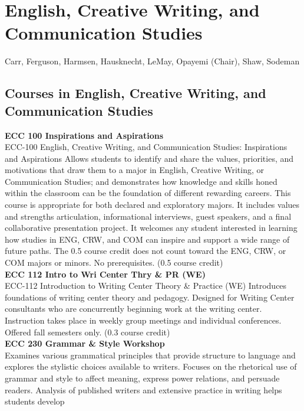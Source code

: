 \documentclass[
  letterpaper,
]{scrbook}
\begin{document}
\section{English, Creative Writing, and Communication
Studies}\label{english-creative-writing-and-communication-studies}

Carr, Ferguson, Harmsen, Hausknecht, LeMay, Opayemi (Chair), Shaw,
Sodeman

\subsection{Courses in English, Creative Writing, and Communication
Studies}\label{courses-in-english-creative-writing-and-communication-studies}

\textbf{ECC 100 Inspirations and Aspirations}\\
ECC-100 English, Creative Writing, and Communication Studies:
Inspirations and Aspirations Allows students to identify and share the
values, priorities, and motivations that draw them to a major in
English, Creative Writing, or Communication Studies; and demonstrates
how knowledge and skills honed within the classroom can be the
foundation of different rewarding careers. This course is appropriate
for both declared and exploratory majors. It includes values and
strengths articulation, informational interviews, guest speakers, and a
final collaborative presentation project. It welcomes any student
interested in learning how studies in ENG, CRW, and COM can inspire and
support a wide range of future paths. The 0.5 course credit does not
count toward the ENG, CRW, or COM majors or minors. No prerequisites.
(0.5 course credit)\\
\textbf{ECC 112 Intro to Wri Center Thry \& PR (WE)}\\
ECC-112 Introduction to Writing Center Theory \& Practice (WE)
Introduces foundations of writing center theory and pedagogy. Designed
for Writing Center consultants who are concurrently beginning work at
the writing center. Instruction takes place in weekly group meetings and
individual conferences. Offered fall semesters only. (0.3 course
credit)\\
\textbf{ECC 230 Grammar \& Style Workshop}\\
Examines various grammatical principles that provide structure to
language and explores the stylistic choices available to writers.
Focuses on the rhetorical use of grammar and style to affect meaning,
express power relations, and persuade readers. Analysis of published
writers and extensive practice in writing helps students develop
\end{document}

